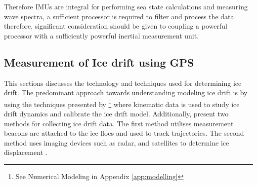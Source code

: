 Therefore IMUs are integral for performing sea state calculations and measuring wave spectra, a sufficient processor is required to filter and process the data therefore, significant consideration should be given to coupling a powerful processor with a sufficiently powerful inertial measurement unit.

\subsection{Measurement of Ice drift using GPS}
\label{sec:ch2_drift}

This sections discusses the technology and techniques used for determining ice drift. The predominant approach towards understanding modeling ice drift is by using the techniques presented by \textcite{hibler1979dynamic}\footnote{See Numerical Modeling in Appendix \ref{app:modelling}} where kinematic data is used to study ice drift dynamics and calibrate the ice drift model. Additionally, \textcite{lepparanta2001sea} present two methods for collecting ice drift data. The first method utilises measurement beacons are attached to the ice floes and used to track trajectories. The second method uses imaging devices such as radar, and satellites to determine ice displacement \cite{lepparanta2001sea}.\par


